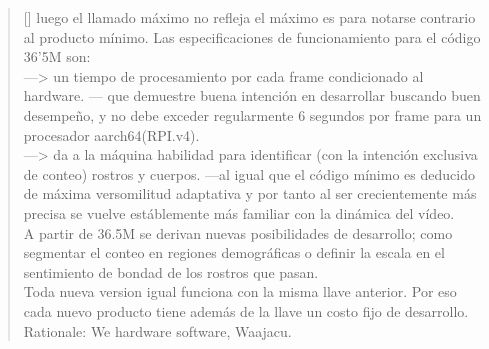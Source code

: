 \documentclass[11pt, a4paper]{article} %
\newcommand{\poemauthorright}[1]{\nopagebreak{\raggedleft\footnotesize\textsc{#1}\par}} %
\begin{document}
\begin{verse}[\versewidth]
{luego el llamado máximo no refleja el máximo
es para notarse contrario al producto mínimo. 
Las especificaciones de funcionamiento 
para el código 36'5M son: \\

---> un tiempo de procesamiento por cada frame condicionado al hardware. ---
que demuestre buena intención en desarrollar buscando buen desempeño, 
y no debe exceder regularmente 6 segundos por frame para un procesador aarch64(RPI.v4). \\

---> da a la máquina habilidad para identificar (con la intención exclusiva de conteo) 
rostros y cuerpos. ---al igual que el código mínimo es 
deducido de máxima versomilitud adaptativa y por tanto 
al ser crecientemente más precisa se vuelve estáblemente más familiar 
con la dinámica del vídeo. \\

A partir de 36.5M se derivan nuevas posibilidades de desarrollo; 
como segmentar el conteo en regiones demográficas o definir la escala en el sentimiento de bondad 
de los rostros que pasan. \\

Toda nueva version igual funciona con la misma llave anterior. Por eso cada nuevo producto tiene además de la 
llave un costo fijo de desarrollo. \\

Rationale: We hardware software, Waajacu.\\

}
\end{verse}


\poemauthorright{www.WAAJACU.com} %

\end{document}
